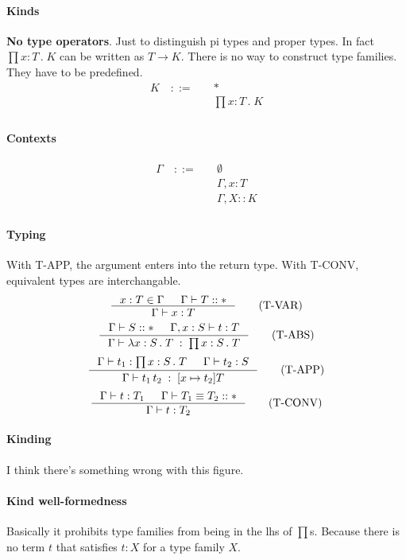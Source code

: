 \documentclass{article}
\newcommand{\DT}{\, .\;}
\begin{document}
\paragraph{Kinds}
  \textbf{No type operators}. Just to distinguish pi types and proper types.
  In fact $\prod x:T \DT K$ can be written as $T \to K$.
  There is no way to construct type families. They have to be predefined.
  \begin{align*}
      K \quad::= \quad & * \tag{proper type} \\ 
        & \prod x:T \DT K \tag{type family} \\
  \end{align*}

\paragraph{Contexts}
  \begin{align*}
    \Gamma \quad::= \quad & \emptyset \tag{empty} \\ 
      & \Gamma, x:T \tag{variable binding} \\
      & \Gamma, X :: K \tag{type variable binding}\\
  \end{align*}

\paragraph{Typing}
  With T-APP, the argument enters into the return type.
  With T-CONV, equivalent types are interchangable.
  \[
    \inference{
        x:T\in\Gamma & \Gamma\vdash T::*
    }{
        \Gamma\vdash x:T
    }
    \tag{T-VAR}
  \]
  \[
    \inference{
        \Gamma\vdash S :: * & \Gamma, x:S \vdash t:T
    }{
        \Gamma\vdash \lambda x:S\DT T\;:\;\prod x:S \DT T
    }
    \tag{T-ABS}
  \]
  \[
    \inference{
        \Gamma\vdash t_1: \prod x :S \DT T &
        \Gamma\vdash t_2: S
    }{
        \Gamma\vdash t_1\, t_2\;:\; [x\mapsto t_2] T
    }
    \tag{T-APP}
  \]
  \[
    \inference{
        \Gamma\vdash t:T_1&
        \Gamma\vdash T_1 \equiv T_2 :: *
    }{
        \Gamma\vdash t:T_2
    }
    \tag{T-CONV}
  \]

\paragraph{Kinding}
  I think there's something wrong with this figure.

\paragraph{Kind well-formedness}
  Basically it prohibits type families from being in the lhs of $\prod$s.
  Because there is no term $t$ that satisfies $t:X$ for a type family $X$.
\end{document}
